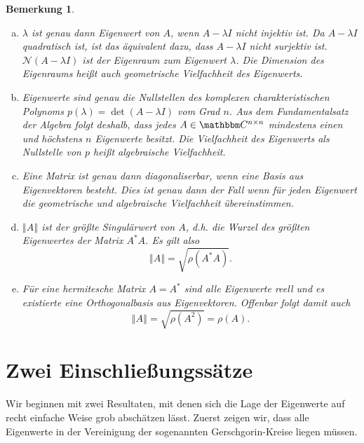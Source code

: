 \documentclass[12pt,a4paper]{book}
\theoremstyle{break}
\newtheorem{bemerkung}[theorem]{Bemerkung}
\theoremstyle{nonumberplain}
\newcommand{\C}{\mathbbm C}
\newcommand{\Kern}{\mathcal{N}}
\newcommand{\norm}[1]{\left\Vert#1\right\Vert}		%
\newcommand{\1}{\mathbbm{1}} 			      	%
\begin{document}
\begin{bemerkung}\label{bem:EWe}
\begin{enumerate}[(a)]
\item $\lambda$ ist genau dann Eigenwert von $A$, wenn $A-\lambda I$ nicht injektiv ist. Da $A-\lambda I$ quadratisch ist, ist das äquivalent dazu, dass $A-\lambda I$ nicht surjektiv ist. $\Kern(A-\lambda I)$ ist der \emph{Eigenraum} zum Eigenwert $\lambda$. Die Dimension des Eigenraums
heißt auch \emph{geometrische Vielfachheit} des Eigenwerts. 
%
\item Eigenwerte sind genau die Nullstellen des komplexen \emph{charakteristischen Polynoms} $p(\lambda)=\det(A-\lambda I)$ vom Grad $n$.
 Aus dem Fundamentalsatz der Algebra folgt deshalb, dass jedes $A\in \C^{n\times n}$ mindestens einen und höchstens $n$ Eigenwerte
 besitzt. Die Vielfachheit des Eigenwerts als Nullstelle von $p$ heißt \emph{algebraische Vielfachheit}.
 \item Eine Matrix ist genau dann \emph{diagonaliserbar}, wenn eine Basis aus Eigenvektoren besteht. Dies ist genau dann der Fall wenn für jeden Eigenwert die geometrische und algebraische Vielfachheit übereinstimmen.
 \item $\norm{A}$ ist der größte Singulärwert von $A$, d.h. die Wurzel des größten Eigenwertes der Matrix $A^*A$. Es gilt also
 \[
 \norm{A}=\sqrt{\rho(A^*A)}.
 \] 
\item Für eine \emph{hermitesche} Matrix $A=A^*$ sind alle Eigenwerte reell und es existierte eine Orthogonalbasis aus Eigenvektoren. Offenbar folgt damit auch
\[
\norm{A}=\sqrt{\rho(A^2)}=\rho(A).
\]
\end{enumerate}
\end{bemerkung}



\section{Zwei Einschließungssätze}

Wir beginnen mit zwei Resultaten, mit denen sich die Lage der Eigenwerte auf recht einfache Weise grob abschätzen lässt.
Zuerst zeigen wir, dass alle Eigenwerte in der Vereinigung der sogenannten Gerschgorin-Kreise liegen müssen.
\end{document}

